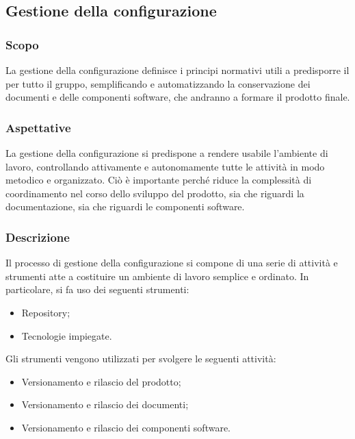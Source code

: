 \subsection{Gestione della configurazione}


\subsubsection{Scopo}

La gestione della configurazione definisce i principi normativi utili a predisporre il  per tutto il gruppo, semplificando e automatizzando la conservazione dei documenti e delle componenti software, che andranno a formare il prodotto finale.

\subsubsection{Aspettative}

La gestione della configurazione si predispone a rendere usabile l'ambiente di lavoro, controllando attivamente e autonomamente tutte le attività in modo metodico e organizzato. Ciò è importante perché riduce la complessità di coordinamento nel corso dello sviluppo del prodotto, sia che riguardi la documentazione, sia che riguardi le componenti software.

\subsubsection{Descrizione}

Il processo di gestione della configurazione si compone di una serie di attività e strumenti atte a costituire un ambiente di lavoro semplice e ordinato. 
In particolare, si fa uso dei seguenti strumenti:
\begin{itemize}
	\item Repository;
	\item Tecnologie impiegate.
\end{itemize}

Gli strumenti vengono utilizzati per svolgere le seguenti attività:
\begin{itemize}
	\item Versionamento e rilascio del prodotto;
	\item Versionamento e rilascio dei documenti;
	\item Versionamento e rilascio dei componenti software.
\end{itemize}


